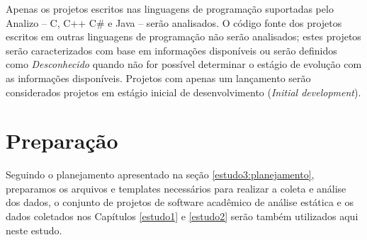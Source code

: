 Apenas os projetos escritos nas linguagens de programação suportadas pelo Analizo 
-- C, C++ C\# e Java -- serão analisados.
O código fonte dos projetos escritos em
outras linguagens de programação não serão analisados; 
estes projetos serão caracterizados com base em informações disponíveis ou 
serão definidos como {\it Desconhecido} quando não for possível determinar 
o estágio de evolução com as informações disponíveis. Projetos com apenas um
lançamento serão considerados projetos em estágio inicial de desenvolvimento
({\it Initial development}).








\section{Preparação} \label{estudo3:preparacao} %

Seguindo o planejamento apresentado na seção \ref{estudo3:planejamento},
preparamos os arquivos e templates necessários para realizar a coleta e análise
dos dados, o conjunto de projetos de software acadêmico de análise estática e
os dados coletados nos Capítulos \ref{estudo1} e \ref{estudo2} serão também
utilizados aqui neste estudo.

